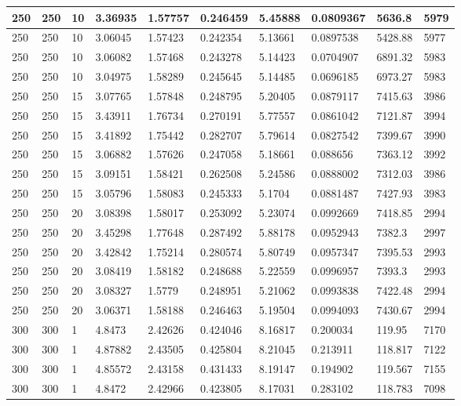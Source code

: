 \begin{landscape}
\begin{longtable}{ | l | l | l | l | l | l | l | l | l | l | }
250 & 250 & 10 & 3.36935 & 1.57757 & 0.246459 & 5.45888 & 0.0809367 & 5636.8 & 5979\\ \hline
250 & 250 & 10 & 3.06045 & 1.57423 & 0.242354 & 5.13661 & 0.0897538 & 5428.88 & 5977\\ \hline
250 & 250 & 10 & 3.06082 & 1.57468 & 0.243278 & 5.14423 & 0.0704907 & 6891.32 & 5983\\ \hline
250 & 250 & 10 & 3.04975 & 1.58289 & 0.245645 & 5.14485 & 0.0696185 & 6973.27 & 5983\\ \hline
250 & 250 & 15 & 3.07765 & 1.57848 & 0.248795 & 5.20405 & 0.0879117 & 7415.63 & 3986\\ \hline
250 & 250 & 15 & 3.43911 & 1.76734 & 0.270191 & 5.77557 & 0.0861042 & 7121.87 & 3994\\ \hline
250 & 250 & 15 & 3.41892 & 1.75442 & 0.282707 & 5.79614 & 0.0827542 & 7399.67 & 3990\\ \hline
250 & 250 & 15 & 3.06882 & 1.57626 & 0.247058 & 5.18661 & 0.088656 & 7363.12 & 3992\\ \hline
250 & 250 & 15 & 3.09151 & 1.58421 & 0.262508 & 5.24586 & 0.0888002 & 7312.03 & 3986\\ \hline
250 & 250 & 15 & 3.05796 & 1.58083 & 0.245333 & 5.1704 & 0.0881487 & 7427.93 & 3983\\ \hline
250 & 250 & 20 & 3.08398 & 1.58017 & 0.253092 & 5.23074 & 0.0992669 & 7418.85 & 2994\\ \hline
250 & 250 & 20 & 3.45298 & 1.77648 & 0.287492 & 5.88178 & 0.0952943 & 7382.3 & 2997\\ \hline
250 & 250 & 20 & 3.42842 & 1.75214 & 0.280574 & 5.80749 & 0.0957347 & 7395.53 & 2993\\ \hline
250 & 250 & 20 & 3.08419 & 1.58182 & 0.248688 & 5.22559 & 0.0996957 & 7393.3 & 2993\\ \hline
250 & 250 & 20 & 3.08327 & 1.5779 & 0.248951 & 5.21062 & 0.0993838 & 7422.48 & 2994\\ \hline
250 & 250 & 20 & 3.06371 & 1.58188 & 0.246463 & 5.19504 & 0.0994093 & 7430.67 & 2994\\ \hline
300 & 300 & 1 & 4.8473 & 2.42626 & 0.424046 & 8.16817 & 0.200034 & 119.95 & 7170\\ \hline
300 & 300 & 1 & 4.87882 & 2.43505 & 0.425804 & 8.21045 & 0.213911 & 118.817 & 7122\\ \hline
300 & 300 & 1 & 4.85572 & 2.43158 & 0.431433 & 8.19147 & 0.194902 & 119.567 & 7155\\ \hline
300 & 300 & 1 & 4.8472 & 2.42966 & 0.423805 & 8.17031 & 0.283102 & 118.783 & 7098\\ \hline

\end{longtable}
\end{landscape}

